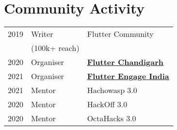 \documentclass[]{deedy-resume-reversed}
\begin{document}
\begin{minipage}[t]{0.35\textwidth}

\sectionsep


\section{Community Activity}

\begin{tabular}{lll}
2019     &Writer     &Flutter Community\\
& (100k+ reach) & \\
2020 & Organiser &\href{https://flutterchd.web.app/}{\bf Flutter Chandigarh} \\
2021 & Organiser &\href{https://youtu.be/_wC_0Irja2k?t=380}{\bf Flutter Engage India}\\
2021 &  Mentor & Hachowasp 3.0\\
2020 & Mentor & HackOff 3.0\\
2020 & Mentor & OctaHacks 3.0\\
\end{tabular}
\sectionsep

\end{minipage}
\end{document}
